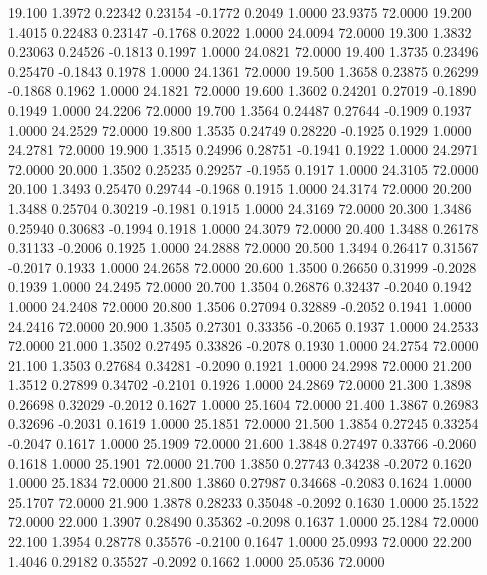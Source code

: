   19.100   1.3972   0.22342   0.23154  -0.1772   0.2049   1.0000  23.9375  72.0000
  19.200   1.4015   0.22483   0.23147  -0.1768   0.2022   1.0000  24.0094  72.0000
  19.300   1.3832   0.23063   0.24526  -0.1813   0.1997   1.0000  24.0821  72.0000
  19.400   1.3735   0.23496   0.25470  -0.1843   0.1978   1.0000  24.1361  72.0000
  19.500   1.3658   0.23875   0.26299  -0.1868   0.1962   1.0000  24.1821  72.0000
  19.600   1.3602   0.24201   0.27019  -0.1890   0.1949   1.0000  24.2206  72.0000
  19.700   1.3564   0.24487   0.27644  -0.1909   0.1937   1.0000  24.2529  72.0000
  19.800   1.3535   0.24749   0.28220  -0.1925   0.1929   1.0000  24.2781  72.0000
  19.900   1.3515   0.24996   0.28751  -0.1941   0.1922   1.0000  24.2971  72.0000
  20.000   1.3502   0.25235   0.29257  -0.1955   0.1917   1.0000  24.3105  72.0000
  20.100   1.3493   0.25470   0.29744  -0.1968   0.1915   1.0000  24.3174  72.0000
  20.200   1.3488   0.25704   0.30219  -0.1981   0.1915   1.0000  24.3169  72.0000
  20.300   1.3486   0.25940   0.30683  -0.1994   0.1918   1.0000  24.3079  72.0000
  20.400   1.3488   0.26178   0.31133  -0.2006   0.1925   1.0000  24.2888  72.0000
  20.500   1.3494   0.26417   0.31567  -0.2017   0.1933   1.0000  24.2658  72.0000
  20.600   1.3500   0.26650   0.31999  -0.2028   0.1939   1.0000  24.2495  72.0000
  20.700   1.3504   0.26876   0.32437  -0.2040   0.1942   1.0000  24.2408  72.0000
  20.800   1.3506   0.27094   0.32889  -0.2052   0.1941   1.0000  24.2416  72.0000
  20.900   1.3505   0.27301   0.33356  -0.2065   0.1937   1.0000  24.2533  72.0000
  21.000   1.3502   0.27495   0.33826  -0.2078   0.1930   1.0000  24.2754  72.0000
  21.100   1.3503   0.27684   0.34281  -0.2090   0.1921   1.0000  24.2998  72.0000
  21.200   1.3512   0.27899   0.34702  -0.2101   0.1926   1.0000  24.2869  72.0000
  21.300   1.3898   0.26698   0.32029  -0.2012   0.1627   1.0000  25.1604  72.0000
  21.400   1.3867   0.26983   0.32696  -0.2031   0.1619   1.0000  25.1851  72.0000
  21.500   1.3854   0.27245   0.33254  -0.2047   0.1617   1.0000  25.1909  72.0000
  21.600   1.3848   0.27497   0.33766  -0.2060   0.1618   1.0000  25.1901  72.0000
  21.700   1.3850   0.27743   0.34238  -0.2072   0.1620   1.0000  25.1834  72.0000
  21.800   1.3860   0.27987   0.34668  -0.2083   0.1624   1.0000  25.1707  72.0000
  21.900   1.3878   0.28233   0.35048  -0.2092   0.1630   1.0000  25.1522  72.0000
  22.000   1.3907   0.28490   0.35362  -0.2098   0.1637   1.0000  25.1284  72.0000
  22.100   1.3954   0.28778   0.35576  -0.2100   0.1647   1.0000  25.0993  72.0000
  22.200   1.4046   0.29182   0.35527  -0.2092   0.1662   1.0000  25.0536  72.0000
